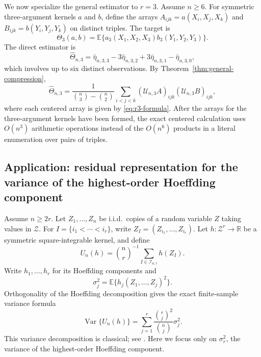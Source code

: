 \documentclass[11pt]{article}
\theoremstyle{plain}
\theoremstyle{definition}
\theoremstyle{remark}
\newcommand{\R}{\mathbb R}
\newcommand{\E}{\mathbb E}
\newcommand{\Var}{\operatorname{Var}}
\newcommand{\cI}{\mathcal I}
\newcommand{\cU}{\mathcal U}
\begin{document}
We now specialize the general estimator to $r=3$.  Assume $n\ge6$.  For
symmetric three-argument kernels $a$ and $b$, define the arrays
$A_{ijk}=a(X_i,X_j,X_k)$ and $B_{ijk}=b(Y_i,Y_j,Y_k)$ on distinct triples.
The target is
\[
 \Theta_3(a,b)=\E\{a_3(X_1,X_2,X_3)b_3(Y_1,Y_2,Y_3)\}.
\]
The direct estimator is
\begin{equation*}
 \widehat\Theta_{n,3}
 =\widehat\eta_{n,3,3}
 -3\widehat\eta_{n,3,2}
 +3\widehat\eta_{n,3,1}
 -\widehat\eta_{n,3,0},
\end{equation*}
which involves up to six distinct observations.  By
Theorem~\ref{thm:general-compression},
\begin{equation*}
 \widehat\Theta_{n,3}
 =\frac{1}{\binom n3-\binom n2}
   \sum_{i<j<k}
   (\cU_{n,3}A)_{ijk}(\cU_{n,3}B)_{ijk},
\end{equation*}
where each centered array is given by \eqref{eq:r3-formula}.  After the
arrays for the three-argument kernels have been formed, the exact centered
calculation uses $O(n^3)$ arithmetic operations instead of the $O(n^6)$
products in a literal enumeration over pairs of triples.


\subsection{Application: residual representation for the variance of the
highest-order Hoeffding component}
\label{subsec:variance-components}

Assume $n\ge 2r$.  Let $Z_1,\ldots,Z_n$ be i.i.d.\ copies of a random variable
$Z$ taking values in $\mathcal Z$.  For $I=\{i_1<\cdots<i_r\}$, write
$Z_I=(Z_{i_1},\ldots,Z_{i_r})$.  Let $h:\mathcal Z^r\to\R$ be a symmetric
square-integrable kernel, and define
\begin{equation*}
 U_n(h)=\binom nr^{-1}\sum_{I\in\cI_{n,r}}h(Z_I).
\end{equation*}
Write $h_1,\ldots,h_r$ for its Hoeffding components and
\begin{equation*}
 \sigma_j^2=\E\{h_j(Z_1,\ldots,Z_j)^2\}.
\end{equation*}
Orthogonality of the Hoeffding decomposition gives the exact finite-sample
variance formula
\begin{equation*}
 \Var\{U_n(h)\}
 =\sum_{j=1}^r\frac{\binom rj^2}{\binom nj}\sigma_j^2.
\end{equation*}
This variance decomposition is classical; see
\citet{Hoeffding1948,Serfling1980}.  Here we focus only on $\sigma_r^2$, the
variance of the highest-order Hoeffding component.
\end{document}
